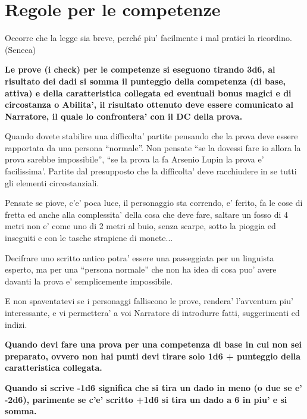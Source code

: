\documentclass[a4paper,11pt,twoside,openany]{dndbook}
\begin{document}
\pagebreak

\section{Regole per le competenze}

\label{regole-per-le-competenze}
\begin{quotebox}
Occorre che la legge sia breve, perché piu' facilmente i mal pratici la ricordino. (Seneca)
\end{quotebox}

\textbf{Le prove (i check) per le competenze si eseguono tirando 3d6, al risultato dei dadi si somma il punteggio della competenza (di base, attiva) e della caratteristica collegata ed eventuali bonus magici e di circostanza o Abilita', il risultato ottenuto deve essere comunicato al Narratore, il quale lo confrontera' con il DC della prova.}

Quando dovete stabilire una difficolta' partite pensando che la prova deve essere rapportata da una persona ``normale''. Non pensate ``se la dovessi fare io allora la prova sarebbe impossibile'', ``se la prova la fa Arsenio Lupin la prova e' facilissima'. Partite dal presupposto che la difficolta' deve racchiudere in se tutti gli elementi circostanziali.

Pensate se piove, c'e' poca luce, il personaggio sta correndo, e' ferito, fa le cose di fretta ed anche alla complessita' della cosa che deve fare, saltare un fosso di 4 metri non e' come uno di 2 metri al buio, senza scarpe, sotto la pioggia ed inseguiti e con le tasche strapiene di monete...

Decifrare uno scritto antico potra' essere una passeggiata per un linguista esperto, ma per una ``persona normale'' che non ha idea di cosa puo' avere davanti la prova e' semplicemente impossibile.

E non spaventatevi se i personaggi falliscono le prove, rendera' l'avventura piu' interessante, e vi permettera' a voi Narratore di introdurre fatti, suggerimenti ed indizi.

\bigskip

\textbf{Quando devi fare una prova per una competenza di base in cui
non sei preparato, ovvero non hai punti devi tirare solo 1d6 + punteggio
della caratteristica collegata.}

\textbf{Quando si scrive -1d6 significa che si tira un dado in meno
(o due se e' -2d6), parimente se c'e' scritto +1d6 si tira un dado
a 6 in piu' e si somma.}
\end{document}
